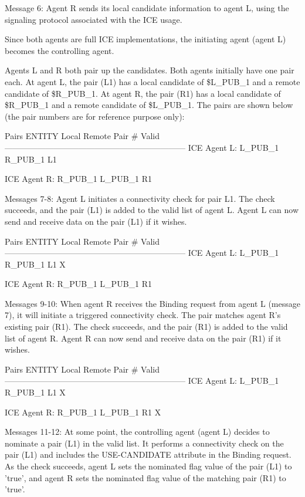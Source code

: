 \documentclass{article}
\begin{document}
Message 6: Agent R sends its local candidate information to agent L, using the signaling protocol associated with the ICE usage.

Since both agents are full ICE implementations, the initiating agent (agent L) becomes the controlling agent.

Agents L and R both pair up the candidates.  Both agents initially have one pair each.  At agent L, the pair (L1) has a local candidate of \$L\_PUB\_1 and a remote candidate of \$R\_PUB\_1.  At agent R, the pair (R1) has a local candidate of \$R\_PUB\_1 and a remote candidate of \$L\_PUB\_1.  The pairs are shown below (the pair numbers are for reference purpose only):

Pairs ENTITY                   Local         Remote     Pair \#     Valid ------------------------------------------------------------------ ICE Agent L:             L\_PUB\_1       R\_PUB\_1       L1

ICE Agent R:             R\_PUB\_1       L\_PUB\_1       R1

Messages 7-8: Agent L initiates a connectivity check for pair L1. The check succeeds, and the pair (L1) is added to the valid list of agent L.  Agent L can now send and receive data on the pair (L1) if it wishes.

Pairs ENTITY                   Local         Remote     Pair \#     Valid ------------------------------------------------------------------ ICE Agent L:             L\_PUB\_1       R\_PUB\_1       L1         X

ICE Agent R:             R\_PUB\_1       L\_PUB\_1       R1

Messages 9-10: When agent R receives the Binding request from agent L (message 7), it will initiate a triggered connectivity check.  The pair matches agent R's existing pair (R1).  The check succeeds, and the pair (R1) is added to the valid list of agent R.  Agent R can now send and receive data on the pair (R1) if it wishes.

Pairs ENTITY                   Local         Remote     Pair \#     Valid ------------------------------------------------------------------ ICE Agent L:             L\_PUB\_1       R\_PUB\_1       L1         X

ICE Agent R:             R\_PUB\_1       L\_PUB\_1       R1         X

Messages 11-12: At some point, the controlling agent (agent L) decides to nominate a pair (L1) in the valid list.  It performs a connectivity check on the pair (L1) and includes the USE-CANDIDATE attribute in the Binding request.  As the check succeeds, agent L sets the nominated flag value of the pair (L1) to 'true', and agent R sets the nominated flag value of the matching pair (R1) to 'true'.
\end{document}
